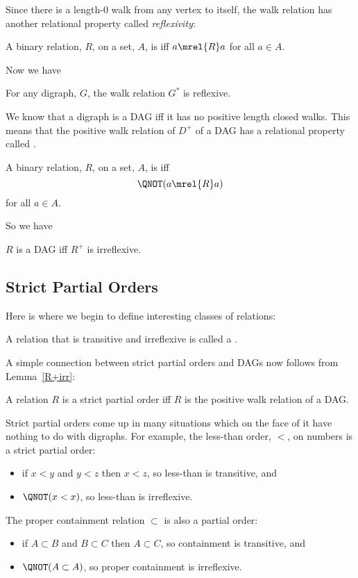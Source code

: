 Since there is a length-0 walk from any vertex to itself, the walk
relation has another relational property called \emph{reflexivity}:

\begin{definition}
A binary relation, $R$, on a set, $A$, is  iff $a
\mrel{R} a$ for all $a \in A$.
\end{definition}
Now we have
\begin{lemma}
For any digraph, $G$, the walk relation $G^*$ is reflexive.
\end{lemma}

We know that a digraph is a DAG iff it has no positive length closed
walks. \iffalse Lemma~\ref{shortestclosedwalk_lem} \fi This means that
the positive walk relation of $D^+$ of a DAG has a relational property
called .

\begin{definition}
A binary relation, $R$, on a set, $A$, is
 iff
\[
\QNOT(a \mrel{R} a)
\]
for all $a \in A$.
\end{definition}
So we have
\begin{lemma}\label{R+irr}
$R$ is a DAG iff $R^+$ is irreflexive.
\end{lemma}

\subsection{Strict Partial Orders}

Here is where we begin to define interesting classes of relations:

\begin{definition}
A relation that is transitive and irreflexive is called a .
\end{definition}

A simple connection between strict partial orders and DAGs now follows from Lemma~\ref{R+irr}:
\begin{theorem}\label{thm:SPOiffDAG}
A relation $R$ is a strict partial order iff $R$ is the positive walk
relation of a DAG.
\end{theorem}

Strict partial orders come up in many situations which on the face of
it have nothing to do with digraphs.  For example, the less-than
order, $<$, on numbers is a strict partial order:
\begin{itemize}
\item if $x <y$ and $y < z$ then $x < z$, so less-than is transitive, and
\item  $\QNOT(x < x)$, so less-than is irreflexive.
\end{itemize}
The proper containment relation $\subset$ is also a
partial order:
\begin{itemize}
\item if $A \subset B$ and $B \subset C$ then $A \subset C$,
so containment is transitive, and
\item  $\QNOT(A \subset A)$, so proper containment is irreflexive.
\end{itemize}

